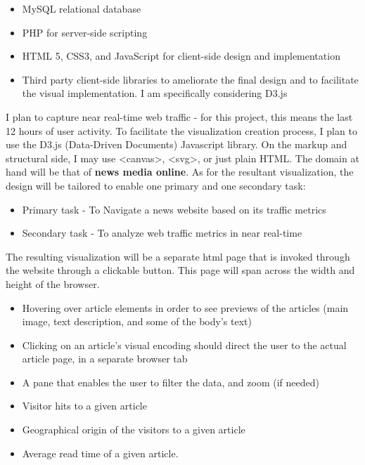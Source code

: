 \documentclass[12pt]{article}
\begin{document}
\begin{itemize}
\item MySQL relational database
\item PHP for server-side scripting
\item HTML 5, CSS3, and JavaScript for client-side design and implementation
\item Third party client-side libraries to ameliorate the final design and to facilitate the visual implementation. I am specifically considering D3.js
\end{itemize}

I plan to capture near real-time web traffic - for this project, this means the last 12 hours of user activity. To facilitate the visualization creation process, I plan to use the D3.js (Data-Driven Documents) Javascript library. On the markup and structural side, I may use <canvas>, <svg>, or just plain HTML. The domain at hand will be that of \textbf{news media online}. As for the resultant visualization, the design will be tailored to enable one primary and one secondary task:
\begin{itemize}
\item Primary task - To Navigate a news website based on its traffic metrics
\item Secondary task - To analyze web traffic metrics in near real-time
\end{itemize}

The resulting visualization will be a separate html page that is invoked through the website through a clickable button. This page will span across the width and height of the browser.

\begin{itemize}
\item Hovering over article elements in order to see previews of the articles (main image, text description, and some of the body's text)
\item Clicking on an article's visual encoding should direct the user to the actual article page, in a separate browser tab
\item A pane that enables the user to filter the data, and zoom (if needed)
\end{itemize}

\begin{itemize}
\item Visitor hits to a given article
\item Geographical origin of the visitors to a given article
\item Average read time of a given article.
\end{itemize}
\end{document}
